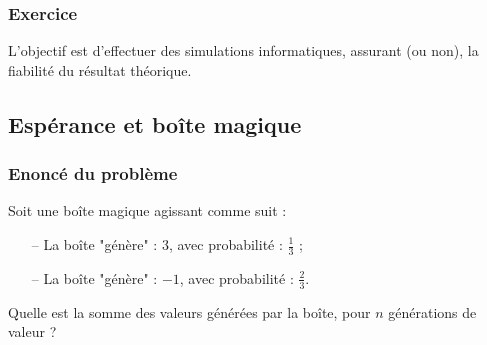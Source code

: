 \subsubsection*{Exercice}
L'objectif est d'effectuer des simulations informatiques,
assurant (ou non), la fiabilité du résultat théorique.










\subsection{Espérance et boîte magique}
\subsubsection*{Enoncé du problème}
Soit une boîte magique 
agissant comme suit : 
\begin{itemize}
\item[--] La boîte "génère" : $3$, avec probabilité : $\frac{1}{3}$ ;
\item[--] La boîte "génère" : $-1$, avec probabilité : $\frac{2}{3}$.
\end{itemize}
Quelle est la somme des valeurs  
générées par la boîte, pour $n$ générations de valeur ?


